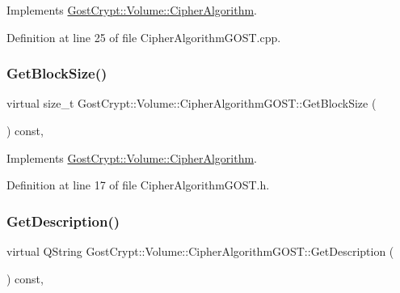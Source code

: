 Implements \hyperlink{class_gost_crypt_1_1_volume_1_1_cipher_algorithm_a6e7b19a0078b49c10536ad2f73b3b1ae}{Gost\+Crypt\+::\+Volume\+::\+Cipher\+Algorithm}.



Definition at line 25 of file Cipher\+Algorithm\+G\+O\+S\+T.\+cpp.

\mbox{\label{class_gost_crypt_1_1_volume_1_1_cipher_algorithm_g_o_s_t_a2a0bb62cd68fd772b6bf8558b6d138a9}} 
\subsubsection{\texorpdfstring{Get\+Block\+Size()}{GetBlockSize()}}
{\footnotesize\ttfamily virtual size\+\_\+t Gost\+Crypt\+::\+Volume\+::\+Cipher\+Algorithm\+G\+O\+S\+T\+::\+Get\+Block\+Size (\begin{DoxyParamCaption}{ }\end{DoxyParamCaption}) const\hspace{0.3cm}{\ttfamily [inline]}, {\ttfamily [virtual]}}



Implements \hyperlink{class_gost_crypt_1_1_volume_1_1_cipher_algorithm_acea94097c86d12a5e5c7bbee613526a2}{Gost\+Crypt\+::\+Volume\+::\+Cipher\+Algorithm}.



Definition at line 17 of file Cipher\+Algorithm\+G\+O\+S\+T.\+h.

\mbox{\label{class_gost_crypt_1_1_volume_1_1_cipher_algorithm_g_o_s_t_a160d57aab8a7f9217c064bf308eb9aa6}} 
\subsubsection{\texorpdfstring{Get\+Description()}{GetDescription()}}
{\footnotesize\ttfamily virtual Q\+String Gost\+Crypt\+::\+Volume\+::\+Cipher\+Algorithm\+G\+O\+S\+T\+::\+Get\+Description (\begin{DoxyParamCaption}{ }\end{DoxyParamCaption}) const\hspace{0.3cm}{\ttfamily [inline]}, {\ttfamily [virtual]}}



